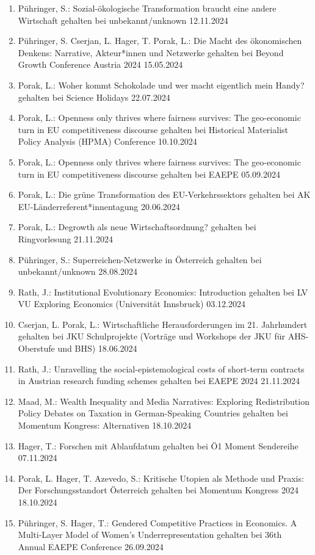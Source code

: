 \begin{enumerate}
	\item Pühringer, S.: Sozial-ökologische Transformation braucht eine andere Wirtschaft gehalten bei unbekannt/unknown 12.11.2024
	\item Pühringer, S. Cserjan, L. Hager, T. Porak, L.: Die Macht des ökonomischen Denkens: Narrative, Akteur*innen und Netzwerke gehalten bei Beyond Growth Conference Austria 2024 15.05.2024
	\item Porak, L.: Woher kommt Schokolade und wer macht eigentlich mein Handy? gehalten bei Science Holidays 22.07.2024
	\item Porak, L.: Openness only thrives where fairness survives: The geo-economic turn in EU competitiveness discourse gehalten bei Historical Materialist Policy Analysis (HPMA) Conference 10.10.2024
	\item Porak, L.: Openness only thrives where fairness survives: The geo-economic turn in EU competitiveness discourse gehalten bei EAEPE 05.09.2024
	\item Porak, L.: Die grüne Transformation des EU-Verkehrssektors gehalten bei AK EU-Länderreferent*innentagung 20.06.2024
	\item Porak, L.: Degrowth als neue Wirtschaftsordnung? gehalten bei Ringvorlesung 21.11.2024
	\item Pühringer, S.: Superreichen-Netzwerke in Österreich gehalten bei unbekannt/unknown 28.08.2024
	\item Rath, J.: Institutional Evolutionary Economics: Introduction gehalten bei LV VU Exploring Economics (Universität Innsbruck) 03.12.2024
	\item Cserjan, L. Porak, L.: Wirtschaftliche Herausforderungen im 21. Jahrhundert gehalten bei JKU Schulprojekte (Vorträge und Workshops der JKU für AHS-Oberstufe und BHS) 18.06.2024
	\item Rath, J.: Unravelling the social-epistemological costs of short-term contracts in Austrian research funding schemes gehalten bei EAEPE 2024 21.11.2024
	\item  Maad, M.: Wealth Inequality and Media Narratives: Exploring Redistribution Policy Debates on Taxation in German-Speaking Countries gehalten bei Momentum Kongress: Alternativen 18.10.2024
	\item Hager, T.: Forschen mit Ablaufdatum gehalten bei Ö1 Moment Sendereihe 07.11.2024
	\item Porak, L. Hager, T. Azevedo, S.: Kritische Utopien als Methode und Praxis: Der Forschungsstandort Österreich gehalten bei Momentum Kongress 2024 18.10.2024
	\item Pühringer, S. Hager, T.: Gendered Competitive Practices in Economics. A Multi-Layer Model of Women’s Underrepresentation gehalten bei 36th Annual EAEPE Conference 26.09.2024

\end{enumerate}

